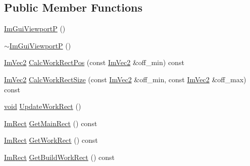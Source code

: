 \subsection*{Public Member Functions}
\begin{DoxyCompactItemize}
\item 
\hyperlink{structImGuiViewportP_a78fca0422ab2cb3ede3676846d92b6aa}{Im\+Gui\+ViewportP} ()
\item 
\hyperlink{structImGuiViewportP_a2110db2d3fff955d9afa36749ca4a90f}{$\sim$\+Im\+Gui\+ViewportP} ()
\item 
\hyperlink{structImVec2}{Im\+Vec2} \hyperlink{structImGuiViewportP_afcfe97edaa5f795bd691433fe11c6ec9}{Calc\+Work\+Rect\+Pos} (const \hyperlink{structImVec2}{Im\+Vec2} \&off\+\_\+min) const
\item 
\hyperlink{structImVec2}{Im\+Vec2} \hyperlink{structImGuiViewportP_a54aa4cd49edc3d6810c35c1f13d094bc}{Calc\+Work\+Rect\+Size} (const \hyperlink{structImVec2}{Im\+Vec2} \&off\+\_\+min, const \hyperlink{structImVec2}{Im\+Vec2} \&off\+\_\+max) const
\item 
\hyperlink{imgui__impl__opengl3__loader_8h_ac668e7cffd9e2e9cfee428b9b2f34fa7}{void} \hyperlink{structImGuiViewportP_a00cd6261263e9637c819908d93580e0c}{Update\+Work\+Rect} ()
\item 
\hyperlink{structImRect}{Im\+Rect} \hyperlink{structImGuiViewportP_adb4c14f0b0a42bff9c1c0ab1971027f7}{Get\+Main\+Rect} () const
\item 
\hyperlink{structImRect}{Im\+Rect} \hyperlink{structImGuiViewportP_ae5c3184b73ea080f14e03ecb344b913e}{Get\+Work\+Rect} () const
\item 
\hyperlink{structImRect}{Im\+Rect} \hyperlink{structImGuiViewportP_a86bd0e71fac71355b11d49d2ba182009}{Get\+Build\+Work\+Rect} () const
\end{DoxyCompactItemize}
